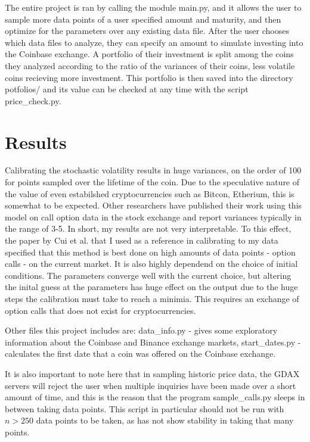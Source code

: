 \documentclass[12pt]{article}
\begin{document}
The entire project is ran by calling the module main.py, and it allows the user to sample more data points of a user specified amount and maturity, and then optimize for the parameters over any existing data file.
After the user chooses which data files to analyze, they can specify an amount to simulate investing into the Coinbase exchange. 
A portfolio of their investment is split among the coins they analyzed according to the ratio of the variances of their coins, less volatile coins recieving more investment.
This portfolio is then saved into the directory potfolios/ and its value can be checked at any time with the script price\_check.py.

\section{Results}
Calibrating the stochastic volatility results in huge variances, on the order of 100 for points sampled over the lifetime of the coin.
Due to the speculative nature of the value of even estabilshed cryptocurrencies such as Bitcon, Etherium, this is somewhat to be expected.
Other researchers have published their work using this model on call option data in the stock exchange and report variances typically in the range of 3-5.
In short, my results are not very interpretable.
To this effect, the paper by Cui et al. that I used as a reference in calibrating to my data specified that this method is best done on high amounts of data points - option calls - on the current market.
It is also highly dependend on the choice of initial conditions.
The parameters converge well with the current choice, but altering the inital guess at the parameters has huge effect on the output due to the huge steps the calibration must take to reach a minimia.
This requires an exchange of option calls that does not exist for cryptocurrencies.

Other files this project includes are: data\_info.py - gives some exploratory information about the Coinbase and Binance exchange markets, start\_dates.py - calculates the first date that a coin was offered on the Coinbase exchange.

It is also important to note here that in sampling historic price data, the GDAX servers will reject the user when multiple inquiries have been made over a short amount of time, and this is the reason that the program sample\_calls.py sleeps in between taking data points.
This script in particular should not be run with $n > 250$ data points to be taken, as has not show stability in taking that many points.

\end{document}
